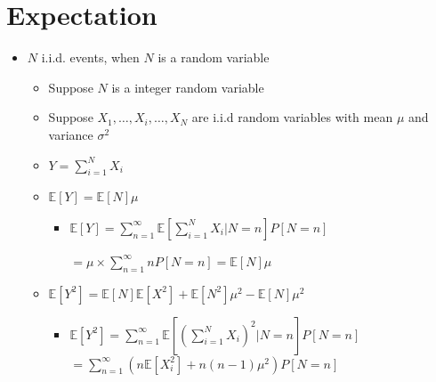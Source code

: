 \documentclass[a4paper]{article}
\begin{document}
\section{Expectation}
\begin{itemize}
    \item $N$ i.i.d. events, when $N$ is a random variable
        \begin{itemize}
            \item Suppose $N$ is a integer random variable
            \item Suppose $X_1, \dots, X_i, \dots, X_N$ are i.i.d random variables with mean $\mu$ and variance $\sigma^2$
            \item $Y = \sum_{i = 1}^N X_i$
            \item $\mathbb{E}[Y] = \mathbb{E}[N] \mu$
                \begin{itemize}
                    \item $\mathbb{E}[Y] = \sum_{n = 1}^\infty \mathbb{E}[\sum_{i = 1}^N X_i|N=n] P[N=n]$

                        $= \mu \times \sum_{n=1}^\infty n P[N=n] = \mathbb{E}[N] \mu$
                \end{itemize}
            \item $\mathbb{E}[Y^2] = \mathbb{E}[N] \mathbb{E}[X^2] + \mathbb{E}[N^2] \mu^2 - \mathbb{E}[N] \mu^2$
                \begin{itemize}
                    \item $\mathbb{E}[Y^2] = \sum_{n = 1}^\infty \mathbb{E}[(\sum_{i = 1}^N X_i)^2|N=n] P[N=n]$
                        $= \sum_{n = 1}^\infty (n \mathbb{E}[X_i^2] + n(n-1)\mu^2) P[N=n]$


\end{itemize}
\end{itemize}
\end{itemize}
\end{document}
